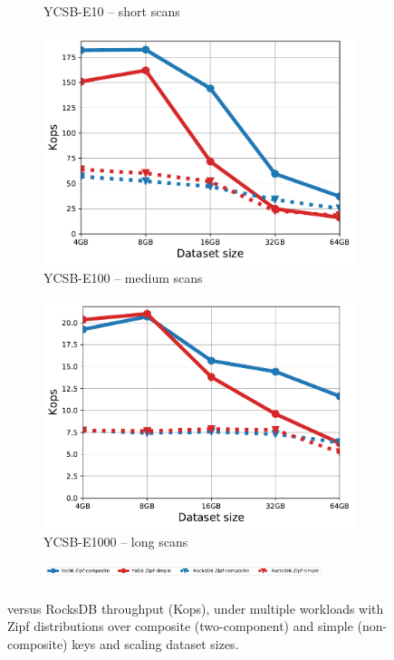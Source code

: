 \begin{figure}[tb]
\begin{subfigure}{0.3\linewidth}
\caption{YCSB-E10 -- short scans}
\label{fig:throughput:e10}
\end{subfigure}
\begin{subfigure}{0.3\linewidth}
\includegraphics[width=\textwidth]{figs/Workload_E_line.pdf}
\caption{YCSB-E100 -- medium scans}
\label{fig:throughput:e100}
\end{subfigure}
\begin{subfigure}{0.3\linewidth}
\includegraphics[width=\textwidth]{figs/Workload_E+_line.pdf}
\caption{YCSB-E1000 -- long scans}
\label{fig:throughput:e1000}
\end{subfigure}
\begin{subfigure}{\linewidth}
\centerline{
\includegraphics[width=0.9\textwidth]{figs/legend.pdf}
\vspace{-5mm}
}
\end{subfigure}
\caption{
{\sys\/ versus RocksDB throughput (Kops), under multiple workloads with Zipf distributions over composite (two-component) and
simple (non-composite) keys and scaling dataset sizes.}
}
\label{fig:throughput}
\end{figure}

